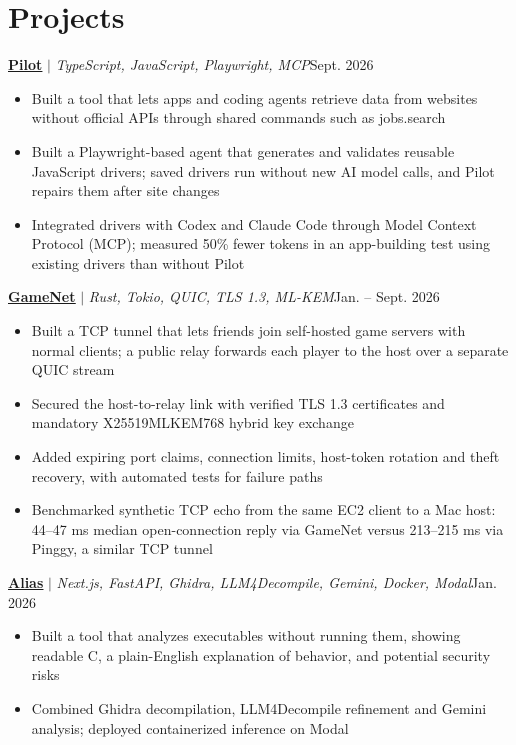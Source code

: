 \documentclass[letterpaper,11pt]{article}
\newcommand{\project}[3]{\textbf{#1} $|$ \textit{\small #2}\hfill #3\vspace{-4pt}}
\newenvironment{bullets}{\begin{itemize}[leftmargin=0.17in,itemsep=0pt,topsep=4pt,parsep=0pt]\small}{\end{itemize}\vspace{1pt}}
\begin{document}
\section{Projects}
\project{\href{https://github.com/Cqctxs/Pilot}{\underline{Pilot}}}{TypeScript, JavaScript, Playwright, MCP}{Sept. 2026}
\begin{bullets}
\item Built a tool that lets apps and coding agents retrieve data from websites without official APIs through shared commands such as jobs.search
\item Built a Playwright-based agent that generates and validates reusable JavaScript drivers; saved drivers run without new AI model calls, and Pilot repairs them after site changes
\item Integrated drivers with Codex and Claude Code through Model Context Protocol (MCP); measured 50\% fewer tokens in an app-building test using existing drivers than without Pilot
\end{bullets}
\project{\href{https://github.com/Cqctxs/gamenet}{\underline{GameNet}}}{Rust, Tokio, QUIC, TLS 1.3, ML-KEM}{Jan. -- Sept. 2026}
\begin{bullets}
\item Built a TCP tunnel that lets friends join self-hosted game servers with normal clients; a public relay forwards each player to the host over a separate QUIC stream
\item Secured the host-to-relay link with verified TLS 1.3 certificates and mandatory X25519MLKEM768 hybrid key exchange
\item Added expiring port claims, connection limits, host-token rotation and theft recovery, with automated tests for failure paths
\item Benchmarked synthetic TCP echo from the same EC2 client to a Mac host: 44--47 ms median open-connection reply via GameNet versus 213--215 ms via Pinggy, a similar TCP tunnel
\end{bullets}
\project{\href{https://github.com/Leo-Zh9/Static_Binary_Decompiler_Framework}{\underline{Alias}}}{Next.js, FastAPI, Ghidra, LLM4Decompile, Gemini, Docker, Modal}{Jan. 2026}
\begin{bullets}
\item Built a tool that analyzes executables without running them, showing readable C, a plain-English explanation of behavior, and potential security risks
\item Combined Ghidra decompilation, LLM4Decompile refinement and Gemini analysis; deployed containerized inference on Modal
\end{bullets}
\end{document}

